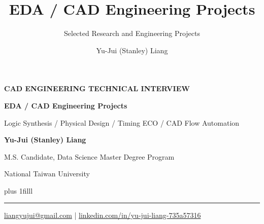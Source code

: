 \documentclass[aspectratio=169,10pt]{beamer}
\title[CAD Technical Interview]{EDA / CAD Engineering Projects}
\subtitle{Selected Research and Engineering Projects}
\author{Yu-Jui (Stanley) Liang}
\institute{National Taiwan University}
\date{}
\newcommand{\smalllabel}[1]{{\scriptsize\bfseries\color{Accent}\MakeUppercase{#1}}}
\begin{document}


{
\begin{frame}[plain]
  \vspace*{1.65cm}
  \smalllabel{CAD Engineering Technical Interview}\par
  \vspace{0.51cm}
  {\raggedright\fontsize{21}{27}\selectfont\bfseries\color{Ink}
    EDA / CAD Engineering Projects\par}
  \vspace{0.29cm}
  {\normalsize\color{Muted}Logic Synthesis \enspace / \enspace Physical Design \enspace / \enspace Timing ECO \enspace / \enspace CAD Flow Automation\par}
  \vspace{0.70cm}
  {\Large\bfseries\color{Ink}Yu-Jui (Stanley) Liang}\par
  \vspace{0.10cm}
  {\normalsize\color{Muted}M.S. Candidate, Data Science Master Degree Program\par}
  {\normalsize\color{Muted}National Taiwan University\par}
  \vskip0pt plus 1filll
  {\color{Accent}\rule{\textwidth}{0.7pt}}\par
  \vspace{0.16cm}
  {\small\href{mailto:liangyujui@gmail.com}{liangyujui@gmail.com}
     \quad | \quad
     \href{https://www.linkedin.com/in/yu-jui-liang-735a57316}{linkedin.com/in/yu-jui-liang-735a57316}\par}
  \vspace*{0.55cm}
\end{frame}}
\end{document}
